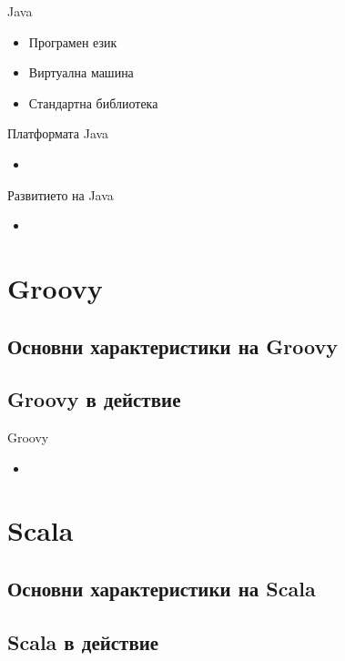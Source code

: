\documentclass[compress,red]{beamer}
\begin{document}
\begin{frame}{Java}
  \transdissolve
  \begin{itemize}
  \item Програмен език
  \item Виртуална машина
  \item Стандартна библиотека
  \end{itemize}
\end{frame}

\begin{frame}{Платформата Java}
  \transdissolve
  \begin{itemize}
  \item 
  \end{itemize}
\end{frame}

\begin{frame}{Развитието на Java}
  \transdissolve
  \begin{itemize}
  \item 
  \end{itemize}
\end{frame}

\section{Groovy}
\subsection{Основни характеристики на Groovy}
\subsection{Groovy в действие}

\begin{frame}{Groovy}
  \transdissolve
  \begin{itemize}
  \item 
  \end{itemize}
\end{frame}


\section{Scala}
\subsection{Основни характеристики на Scala}
\subsection{Scala в действие}
\end{document}
